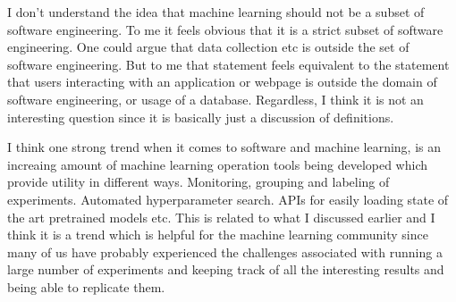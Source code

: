 \documentclass{article}
\begin{document}
I don't understand the idea that machine learning should not be a subset of software engineering. To me it feels obvious that it is a strict subset of software engineering. One could argue that data collection etc is outside the set of software engineering. But to me that statement feels equivalent to the statement that users interacting with an application or webpage is outside the domain of software engineering, or usage of a database. Regardless, I think it is not an interesting question since it is basically just a discussion of definitions.

I think one strong trend when it comes to software and machine learning, is an increaing amount of machine learning operation tools being developed which provide utility in different ways. Monitoring, grouping and labeling of experiments. Automated hyperparameter search. APIs for easily loading state of the art pretrained models etc. This is related to what I discussed earlier and I think it is a trend which is helpful for the machine learning community since many of us have probably experienced the challenges associated with running a large number of experiments and keeping track of all the interesting results and being able to replicate them.

\newpage


\end{document}
